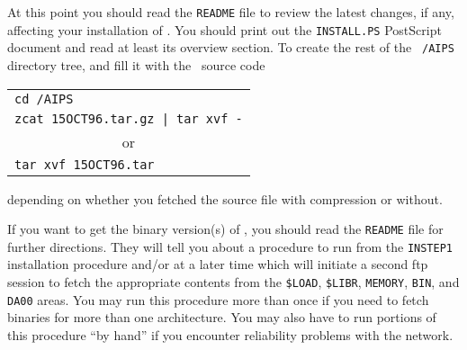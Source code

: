 At this point you should read the {\tt README} file to review the
latest changes, if any, affecting your installation of \hbox{\AIPS}.
You should print out the {\tt INSTALL.PS} PostScript document and
read at least its overview section.  To create the rest of the {\tt
/AIPS} directory tree, and fill it with the \AIPS\ source code
\vskip -10pt
\begin{center}
\begin{tabular}{l}
   {\tt cd /AIPS} \\
   {\tt zcat 15OCT96.tar.gz | tar xvf -} \\
\multicolumn{1}{c}{or} \\
   {\tt tar xvf 15OCT96.tar}
\end{tabular}
\end{center}
\vskip -10pt
depending on whether you fetched the source file with compression or
without.

If you want to get the binary version(s) of \AIPS, you should read the
{\tt README} file for further directions.  They will tell you about a
procedure to run from the {\tt INSTEP1} installation procedure and/or
at a later time which will initiate a second ftp session to fetch the
appropriate contents from the {\tt \$LOAD}, {\tt \$LIBR}, {\tt MEMORY},
{\tt BIN}, and {\tt DA00} areas.  You may run this procedure more than
once if you need to fetch binaries for more than one architecture.
You may also have to run portions of this procedure ``by hand'' if you
encounter reliability problems with the network.

